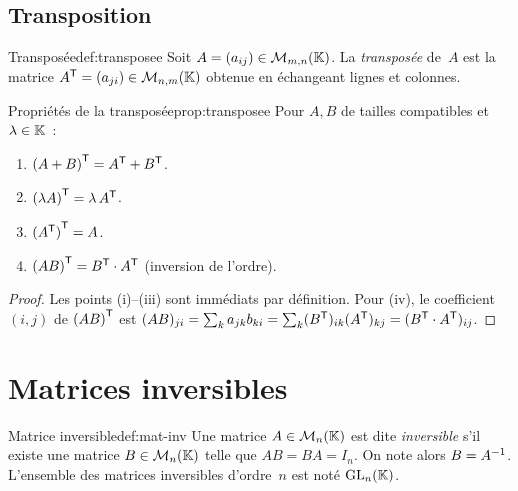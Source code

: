 \subsection{Transposition}\label{subsec:transposition}

\begin{definition}{Transposée}{def:transposee}
  Soit $A=(a_{ij})\in\mathcal{M}_{m,n}({\mathbb{K}})$. La \emph{transposée}%
   de~$A$ est la matrice
  ${A}^{\mathsf{T}}=(a_{ji})\in\mathcal{M}_{n,m}({\mathbb{K}})$ obtenue en échangeant lignes
  et colonnes.
\end{definition}

\begin{proposition}{Propriétés de la transposée}{prop:transposee}
  Pour $A,B$ de tailles compatibles et $\lambda\in{\mathbb{K}}$~:
  \begin{enumerate}[label=(\roman*)]
    \item ${(A+B)}^{\mathsf{T}}={A}^{\mathsf{T}}+{B}^{\mathsf{T}}$.
    \item ${(\lambda A)}^{\mathsf{T}}=\lambda\,{A}^{\mathsf{T}}$.
    \item ${({A}^{\mathsf{T}})}^{\mathsf{T}}=A$.
    \item ${(AB)}^{\mathsf{T}}={B}^{\mathsf{T}}\cdot{A}^{\mathsf{T}}$
      (inversion de l'ordre).
  \end{enumerate}
\end{proposition}

\begin{proof}
  Les points (i)--(iii) sont immédiats par définition. Pour (iv), le
  coefficient $(i,j)$ de ${(AB)}^{\mathsf{T}}$ est $(AB)_{ji}
  =\sum_k a_{jk}b_{ki}=\sum_k ({B}^{\mathsf{T}})_{ik}({A}^{\mathsf{T}})_{kj}
  =({B}^{\mathsf{T}}\cdot{A}^{\mathsf{T}})_{ij}$.
\end{proof}

\section{Matrices inversibles}\label{sec:matrices-inversibles}

\begin{definition}{Matrice inversible}{def:mat-inv}
  Une matrice $A\in\mathcal{M}_n({\mathbb{K}})$ est dite
  \emph{inversible} s'il existe une matrice
  $B\in\mathcal{M}_n({\mathbb{K}})$ telle que $AB=BA=I_n$. On note alors $B={A}^{-1}$.
  L'ensemble des matrices inversibles d'ordre~$n$ est noté
  $\operatorname{GL}_n({\mathbb{K}})$.
\end{definition}

